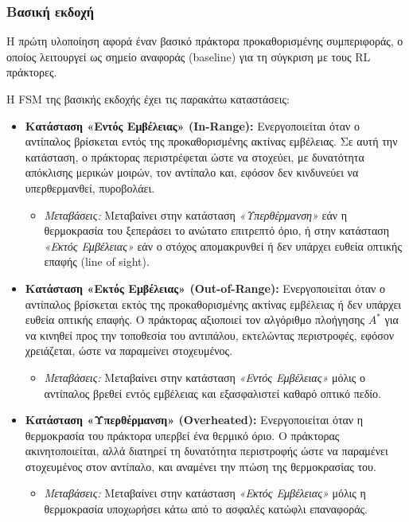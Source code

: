 \documentclass[12pt]{article}
\begin{document}
\subsubsection{Βασική εκδοχή}
Η πρώτη υλοποίηση αφορά έναν βασικό πράκτορα προκαθορισμένης συμπεριφοράς, ο οποίος λειτουργεί ως σημείο αναφοράς (baseline) για τη σύγκριση με τους RL πράκτορες.

Η FSM της βασικής εκδοχής έχει τις παρακάτω καταστάσεις:
\begin{itemize}
    \item \textbf{Κατάσταση «Εντός Εμβέλειας» (In-Range):} 
    Ενεργοποιείται όταν ο αντίπαλος βρίσκεται εντός της προκαθορισμένης ακτίνας εμβέλειας. Σε αυτή την κατάσταση, ο πράκτορας περιστρέφεται ώστε να στοχεύει, με δυνατότητα απόκλισης μερικών μοιρών, τον αντίπαλο και, εφόσον δεν κινδυνεύει να υπερθερμανθεί, πυροβολάει.
    \begin{itemize}
        \item \textit{Μεταβάσεις:} Μεταβαίνει στην κατάσταση \textit{«Υπερθέρμανση»} εάν η θερμοκρασία του ξεπεράσει το ανώτατο επιτρεπτό όριο, ή στην κατάσταση \textit{«Εκτός Εμβέλειας»} εάν ο στόχος απομακρυνθεί ή δεν υπάρχει ευθεία οπτικής επαφής (line of sight).
    \end{itemize}

    \item \textbf{Κατάσταση «Εκτός Εμβέλειας» (Out-of-Range):} 
    Ενεργοποιείται όταν ο αντίπαλος βρίσκεται εκτός της προκαθορισμένης ακτίνας εμβέλειας ή δεν υπάρχει ευθεία οπτικής επαφής. Ο πράκτορας αξιοποιεί τον αλγόριθμο πλοήγησης $A^*$ για να κινηθεί προς την τοποθεσία του αντιπάλου, εκτελώντας περιστροφές, εφόσον χρειάζεται, ώστε να παραμείνει στοχευμένος.
    \begin{itemize}
        \item \textit{Μεταβάσεις:} Μεταβαίνει στην κατάσταση \textit{«Εντός Εμβέλειας»} μόλις ο αντίπαλος βρεθεί εντός εμβέλειας και εξασφαλιστεί καθαρό οπτικό πεδίο.
    \end{itemize}

    \item \textbf{Κατάσταση «Υπερθέρμανση» (Overheated):} 
    Ενεργοποιείται όταν η θερμοκρασία του πράκτορα υπερβεί ένα θερμικό όριο. Ο πράκτορας ακινητοποιείται, αλλά διατηρεί τη δυνατότητα περιστροφής ώστε να παραμένει στοχευμένος στον αντίπαλο, και αναμένει την πτώση της θερμοκρασίας του.
    \begin{itemize}
        \item \textit{Μεταβάσεις:} Μεταβαίνει στην κατάσταση \textit{«Εκτός Εμβέλειας»} μόλις η θερμοκρασία υποχωρήσει κάτω από το ασφαλές κατώφλι επαναφοράς.
    \end{itemize}
\end{itemize}
\end{document}
